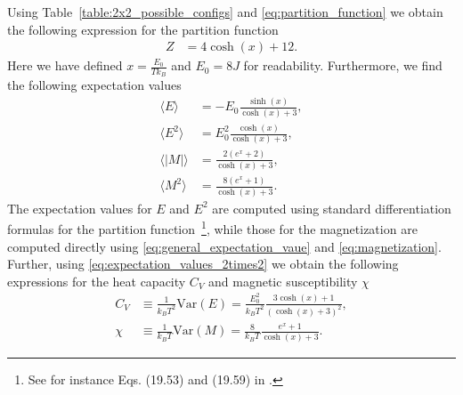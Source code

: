 \documentclass[english,notitlepage,reprint]{revtex4-2}  %
\begin{document}
Using Table~\ref{table:2x2_possible_configs} and \eqref{eq:partition_function} we obtain the following expression for the partition function
\begin{align}
    Z & = 4 \cosh(x) + 12.  \label{eq:Z_2x2lattice}
\end{align}
Here we have defined $x = \frac{E_0}{T k_{B}}$ and $E_0 = 8J$ for readability.
Furthermore, 
we find the following expectation values
\begin{subequations}    \label{eq:expectation_values_2times2}
\begin{align}
    \langle E \rangle & = -E_0 \frac{\sinh(x)}{\cosh(x) + 3}, \label{app:eq:langleErangle}\\
    \langle E^2 \rangle & = E_0^2 \frac{\cosh(x)}{\cosh(x) + 3}, \\
    \langle |M| \rangle & = \frac{2(e^{x} + 2)}{\cosh(x) + 3}, \label{app:eq:langleMrangle}\\   
    \langle M^2 \rangle & = \frac{8(e^{x} + 1)}{\cosh(x) + 3}.
\end{align}
\end{subequations}
The expectation values for \(E\) and \(E^2\) are computed using standard differentiation formulas for the partition function~\footnote{See for instance Eqs. (19.53) and (19.59) in \cite{IntroStatMekSwendsen}.}, while those for the magnetization are computed directly using \eqref{eq:general_expectation_vaue} and \eqref{eq:magnetization}.
Further, using \eqref{eq:expectation_values_2times2} we obtain the following expressions for the heat capacity $C_V$ and magnetic susceptibility $\chi$
\begin{align}
    C_V &\equiv \frac{1}{k_BT^2}\text{Var}(E) = \frac{E_0^2}{k_B T^2} \frac{3\cosh(x) + 1}{(\cosh(x) + 3)^2}, \label{app:eq:C_V}\\
    \chi &\equiv \frac{1}{k_BT}\text{Var}(M) = \frac{8}{k_B T} \frac{e^x+1}{\cosh(x)+3}.\label{app:eq:chi}
\end{align}

\newpage

% 
% 


\end{document}
